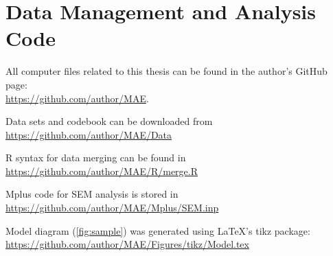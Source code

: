 \section{Data Management and Analysis Code}
\label{app:B}

\MAEindent

All computer files related to this thesis can be found in the author's GitHub page:\\
\href{https://github.com/author/MAE}{https://github.com/author/MAE}.

\begin{MAEitemize}
\item Data sets and codebook can be downloaded from \href{https://github.com/author/MAE/Data}{https://github.com/author/MAE/Data}
\item R syntax for data merging can be found in \href{https://github.com/author/MAE/R/merge.R}{https://github.com/author/MAE/R/merge.R}
\item Mplus code for SEM analysis is stored in \href{https://github.com/author/MAE/Mplus/SEM.inp}{https://github.com/author/MAE/Mplus/SEM.inp}
\item Model diagram (\cref{fig:sample}) was generated using \LaTeX's tikz package: \href{https://github.com/author/MAE/Figures/tikz/Model.tex}{https://github.com/author/MAE/Figures/tikz/Model.tex}
\end{MAEitemize}
